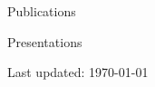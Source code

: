\documentclass{resume} %
\begin{document}
\begin{rSection}{Publications}



  \end{rSection}

  \begin{rSection}{Presentations}
  \vspace*{-\baselineskip}

\end{rSection}





\sectionskip
\sectionskip
\sectionskip
\sectionskip
\centering
Last updated: \today
\end{document}
